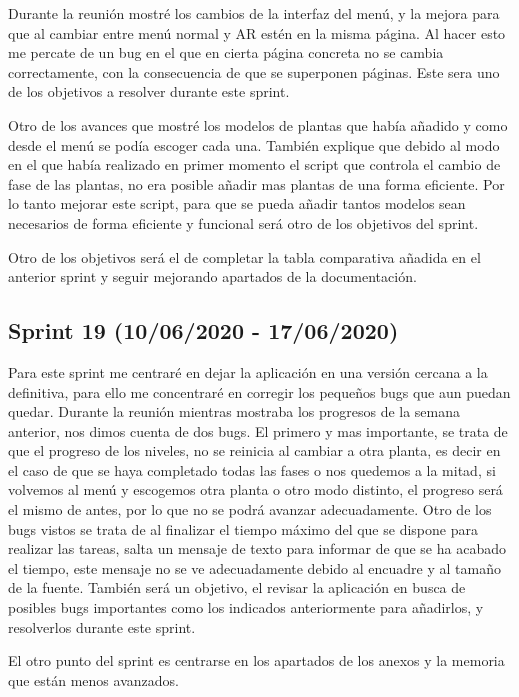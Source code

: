  Durante la reunión mostré los cambios de la interfaz del menú, y la mejora para que al cambiar entre menú normal y AR estén en la misma página. Al hacer esto me percate de un bug en el que en cierta página concreta no se cambia correctamente, con la consecuencia de que se superponen páginas. Este sera uno de los objetivos a resolver durante este sprint.
 
 Otro de los avances que mostré los modelos de plantas que había añadido y como desde el menú se podía escoger cada una.  También explique que debido al modo en el que había realizado en primer momento el script que controla el cambio de fase de las plantas, no era posible añadir mas plantas de una forma eficiente. Por lo tanto mejorar este script, para que se pueda añadir tantos modelos sean necesarios de forma eficiente y funcional será otro de los objetivos del sprint.
 
Otro de los objetivos será el de completar la tabla comparativa añadida en el anterior sprint y seguir mejorando apartados de la documentación.
 
\subsection{Sprint 19 (10/06/2020 - 17/06/2020)}

 Para este sprint me centraré en dejar la aplicación en una versión cercana a la definitiva, para ello me concentraré en corregir los pequeños bugs que aun puedan quedar. Durante la reunión mientras mostraba los progresos de la semana anterior, nos dimos cuenta de dos bugs. El primero y mas importante, se trata de que el progreso de los niveles, no se reinicia al cambiar a otra planta, es decir en el caso de que se haya completado todas las fases o nos quedemos a la mitad, si volvemos al menú y escogemos otra planta o otro modo distinto, el progreso será el mismo de antes, por lo que no se podrá avanzar adecuadamente. Otro de los bugs vistos se trata de al finalizar el tiempo máximo del que se dispone para realizar las tareas, salta un mensaje de texto para informar de que se ha acabado el tiempo, este mensaje no se ve adecuadamente debido al encuadre y al tamaño de la fuente. También será un objetivo, el revisar la aplicación en busca de posibles bugs importantes como los indicados anteriormente para añadirlos, y resolverlos durante este sprint.
 
 El otro punto del sprint es centrarse en los apartados de los anexos y la memoria que están menos avanzados.
 
